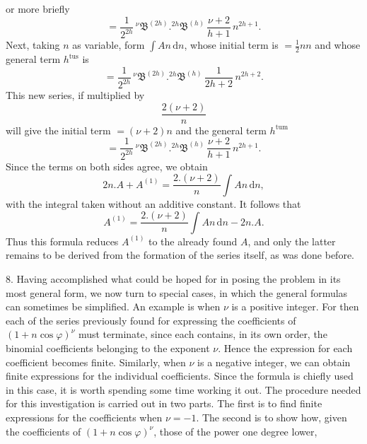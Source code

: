 \par\noindent{}%
or more briefly
\[
= \frac{1}{2^{2h}}\,{}^{\nu}\mathfrak{B}^{(2h)} .  {}^{2h}\mathfrak{B}^{(h)}\,\frac{\nu+2}{h+1}\,n^{2h+1}.
\]
Next, taking $n$ as variable, form $\int An\,\mathrm{d}n$, whose initial term is $=\frac{1}{2}nn$ and whose general term $h^{\text{tus}}$ is
\[
= \frac{1}{2^{2h}}\,{}^{\nu}\mathfrak{B}^{(2h)} .  {}^{2h}\mathfrak{B}^{(h)}\,\frac{1}{2h+2}\,n^{2h+2}.
\]
This new series, if multiplied by
\[
\frac{2(\nu+2)}{n}
\]
will give the initial term $=(\nu+2)n$ and the general term $h^{\text{tum}}$
\[
= \frac{1}{2^{2h}}\,{}^{\nu}\mathfrak{B}^{(2h)} .  {}^{2h}\mathfrak{B}^{(h)}\,\frac{\nu+2}{h+1}\,n^{2h+1}.
\]
Since the terms on both sides agree, we obtain
\[
2n .  A + A^{(1)} = \frac{2 . (\nu+2)}{n}\int An\,\mathrm{d}n,
\]
with the integral taken without an additive constant. It follows that
\[
A^{(1)} = \frac{2 . (\nu+2)}{n}\int An\,\mathrm{d}n - 2n .  A.
\]
\noindent\hspace*{\parindent}Thus this formula reduces $A^{(1)}$ to the already found $A$, and only the latter remains to be derived from the formation of the series itself, as was done before.

8. Having accomplished what could be hoped for in posing the problem in its most general form, we now turn to special cases, in which the general formulas can sometimes be simplified. An example is when $\nu$ is a positive integer. For then each of the series previously found for expressing the coefficients of $(1+n\cos\varphi)^{\nu}$ must terminate, since each contains, in its own order, the binomial coefficients belonging to the exponent $\nu$. Hence the expression for each coefficient becomes finite. Similarly, when $\nu$ is a negative integer, we can obtain finite expressions for the individual coefficients. Since the formula is chiefly used in this case, it is worth spending some time working it out. The procedure needed for this investigation is carried out in two parts. The first is to find finite expressions for the coefficients when $\nu=-1$. The second is to show how, given the coefficients of $(1+n\cos\varphi)^{\nu}$, those of the power one degree lower,
